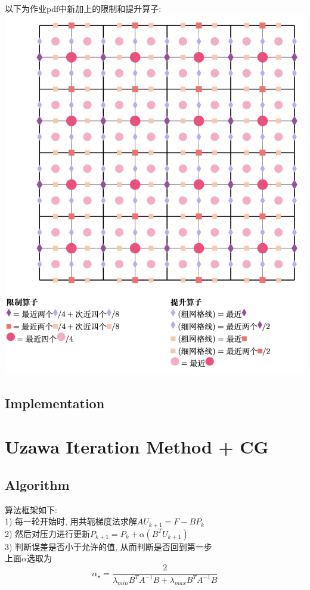 \documentclass{article}
\begin{document}
以下为作业pdf中新加上的限制和提升算子:\\
\includegraphics[scale=0.5]{image/updownpdf.png}\\
\subsection{Implementation}
\section{Uzawa Iteration Method + CG}
\subsection{Algorithm}
算法框架如下:\\
1) 每一轮开始时, 用共轭梯度法求解$AU_{k+1}=F-BP_k$\\
2) 然后对压力进行更新$P_{k+1}=P_k+\alpha(B^TU_{k+1})$\\
3) 判断误差是否小于允许的值, 从而判断是否回到第一步\\
上面$\alpha$选取为\\
$$
\alpha_{\star}=\frac{2}{\lambda_{min}{B^TA^{-1}B}+\lambda_{max}{B^TA^{-1}B}}
$$
\end{document}

